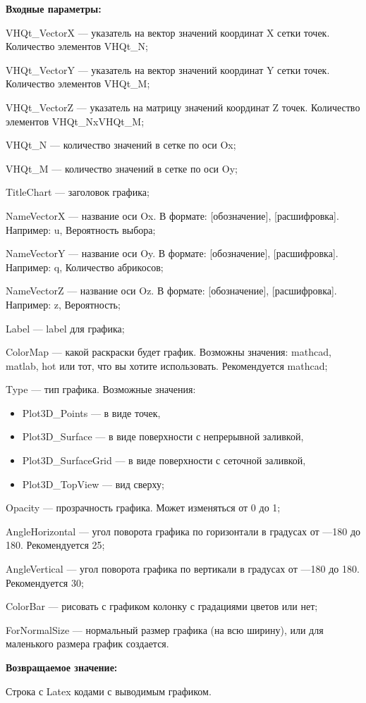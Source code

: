\textbf{Входные параметры:}
 
VHQt\_VectorX --- указатель на вектор значений координат X сетки точек. Количество элементов VHQt\_N;
 
VHQt\_VectorY --- указатель на вектор значений координат Y сетки точек. Количество элементов VHQt\_M;
 
VHQt\_VectorZ --- указатель на матрицу значений координат Z точек. Количество элементов VHQt\_NxVHQt\_M;
 
VHQt\_N --- количество значений в сетке по оси Ox;
 
VHQt\_M --- количество значений в сетке по оси Oy;
 
TitleChart --- заголовок графика;
 
NameVectorX --- название оси Ox. В формате: [обозначение], [расшифровка]. Например: u, Вероятность выбора;
 
NameVectorY --- название оси Oy. В формате: [обозначение], [расшифровка]. Например: q, Количество абрикосов;
 
NameVectorZ --- название оси Oz. В формате: [обозначение], [расшифровка]. Например: z, Вероятность;
 
Label --- label для графика;
 
ColorMap --- какой раскраски будет график. Возможны значения: mathcad, matlab, hot или тот, что вы хотите использовать. Рекомендуется mathcad;
 
Type --- тип графика. Возможные значения:

\begin{itemize}
\item Plot3D\_Points --- в виде точек,
 
\item Plot3D\_Surface --- в виде поверхности с непрерывной заливкой,
 
\item Plot3D\_SurfaceGrid --- в виде поверхности с сеточной заливкой,
 
\item Plot3D\_TopView --- вид сверху;
\end{itemize}
 
Opacity --- прозрачность графика. Может изменяться от 0 до 1;
 
AngleHorizontal --- угол поворота графика по горизонтали в градусах от ---180 до 180. Рекомендуется 25;
 
AngleVertical --- угол поворота графика по вертикали в градусах от ---180 до 180. Рекомендуется 30;
 
ColorBar --- рисовать с графиком колонку с градациями цветов или нет;
 
ForNormalSize --- нормальный размер графика (на всю ширину), или для маленького размера график создается.
	
\textbf{Возвращаемое значение:}

Строка с Latex кодами с выводимым графиком.